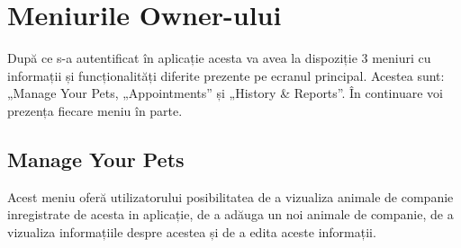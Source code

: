\section{Meniurile Owner-ului}


După ce s-a autentificat în aplicație acesta va avea la dispoziție 3 meniuri cu informații și funcționalități diferite prezente pe ecranul principal. Acestea sunt: „Manage Your Pets, „Appointments” și „History \& Reports”. În continuare voi prezența fiecare meniu în parte. 

\subsection{Manage Your Pets}

Acest meniu oferă utilizatorului posibilitatea de a vizualiza  animale de companie inregistrate de acesta in aplicație, de a adăuga un noi animale de companie, de a vizualiza informațiile despre acestea și de a edita aceste informații.

